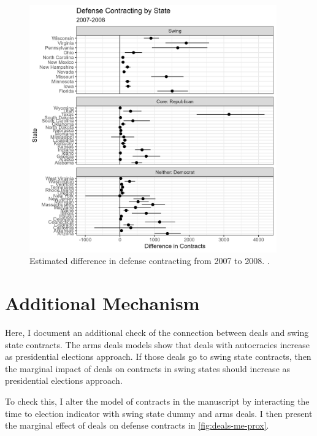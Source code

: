 \documentclass[12pt]{article}
\begin{document}
\begin{figure}[htpb]
	\centering
		\includegraphics[width=0.95\textwidth]{est-08-cycle-facet.png}
	\caption{Estimated difference in defense contracting from 2007 to 2008. .}
	\label{fig:est-08-cycle-facet}
\end{figure}

\newpage 

\section{Additional Mechanism}

Here, I document an additional check of the connection between deals and swing state contracts. 
The arms deals models show that deals with autocracies increase as presidential elections approach. 
If those deals go to swing state contracts, then the marginal impact of deals on contracts in swing states should increase as presidential elections approach. 


To check this, I alter the model of contracts in the manuscript by interacting the time to election indicator with swing state dummy and arms deals. 
I then present the marginal effect of deals on defense contracts in \autoref{fig:deals-me-prox}. 
\end{document}
